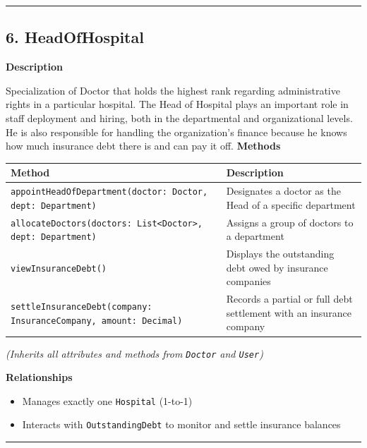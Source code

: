 \documentclass[12pt, a4paper]{article}
\begin{document}
\par\medskip\hrule\medskip

\subsection{6. HeadOfHospital}\label{sec:6-headofhospital}

\textbf{Description}

Specialization of Doctor that holds the highest rank regarding administrative rights in a particular hospital. The Head of Hospital plays an important role in staff deployment and hiring, both in the departmental and organizational levels. He is also responsible for handling the organization’s finance because he knows how much insurance debt there is and can pay it off.
\textbf{Methods}

\begin{center}
\small
\renewcommand{\arraystretch}{1.35}
\begin{tabularx}{\textwidth}{|M|Y|}
\hline
{}
\textbf{Method} & \textbf{Description} \\ \hline
\texttt{appointHeadOfDepartment(doctor: Doctor, dept: Department)} & Designates a doctor as the Head of a specific department \\ \hline
\texttt{allocateDoctors(doctors: List<Doctor>, dept: Department)} & Assigns a group of doctors to a department \\ \hline
\texttt{viewInsuranceDebt()} & Displays the outstanding debt owed by insurance companies \\ \hline
\texttt{settleInsuranceDebt(company: InsuranceCompany, amount: Decimal)} & Records a partial or full debt settlement with an insurance company \\ \hline
\end{tabularx}
\end{center}

\emph{(Inherits all attributes and methods from \texttt{Doctor} and \texttt{User})}

\textbf{Relationships}

\begin{itemize}
    \item Manages exactly one \texttt{Hospital} (1-to-1)
    \item Interacts with \texttt{OutstandingDebt} to monitor and settle insurance balances
\end{itemize}

\par\medskip\hrule\medskip
\end{document}
